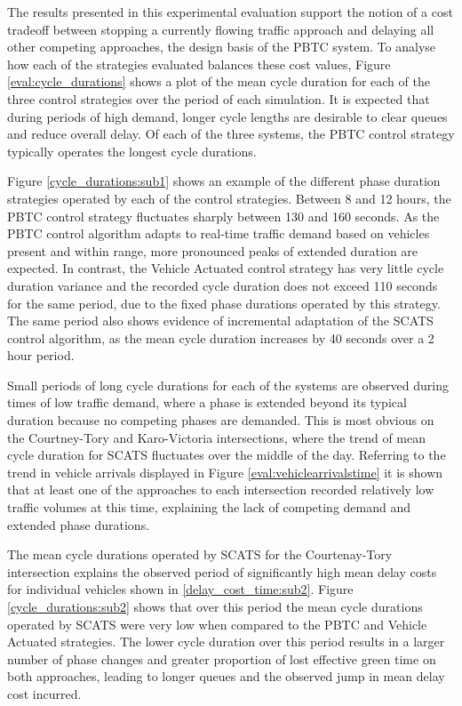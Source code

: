 The results presented in this experimental evaluation support the notion of a cost tradeoff between stopping a currently flowing traffic approach and delaying all other competing approaches, the design basis of the PBTC system. To analyse how each of the strategies evaluated balances these cost values, Figure \ref{eval:cycle_durations} shows a plot of the mean cycle duration for each of the three control strategies over the period of each simulation. It is expected that during periods of high demand, longer cycle lengths are desirable to clear queues and reduce overall delay. Of each of the three systems, the PBTC control strategy typically operates the longest cycle durations.

Figure \ref{cycle_durations:sub1} shows an example of the different phase duration strategies operated by each of the control strategies. Between 8 and 12 hours, the PBTC control strategy fluctuates sharply between 130 and 160 seconds. As the PBTC control algorithm adapts to real-time traffic demand based on vehicles present and within range, more pronounced peaks of extended duration are expected. In contrast, the Vehicle Actuated control strategy has very little cycle duration variance and the recorded cycle duration does not exceed 110 seconds for the same period, due to the fixed phase durations operated by this strategy. The same period also shows evidence of incremental adaptation of the SCATS control algorithm, as the mean cycle duration increases by 40 seconds over a 2 hour period. 

Small periods of long cycle durations for each of the systems are observed during times of low traffic demand, where a phase is extended beyond its typical duration because no competing phases are demanded. This is most obvious on the Courtney-Tory and Karo-Victoria intersections, where the trend of mean cycle duration for SCATS fluctuates over the middle of the day. Referring to the trend in vehicle arrivals displayed in Figure \ref{eval:vehiclearrivalstime} it is shown that at least one of the approaches to each intersection recorded relatively low traffic volumes at this time, explaining the lack of competing demand and extended phase durations.

The mean cycle durations operated by SCATS for the Courtenay-Tory intersection explains the observed period of significantly high mean delay costs for individual vehicles shown in \ref{delay_cost_time:sub2}. Figure \ref{cycle_durations:sub2} shows that over this period the mean cycle durations operated by SCATS were very low when compared to the PBTC and Vehicle Actuated strategies. The lower cycle duration over this period results in a larger number of phase changes and greater proportion of lost effective green time on both approaches, leading to longer queues and the observed jump in mean delay cost incurred. 

